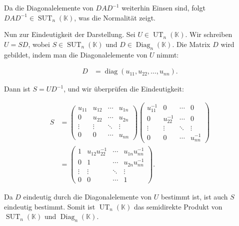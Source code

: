 Da die Diagonalelemente von $DAD^{-1}$ weiterhin Einsen sind, folgt $DAD^{-1} \in \operatorname{SUT}_n(\mathbb{K})$, was die Normalität zeigt.

Nun zur Eindeutigkeit der Darstellung. Sei $U \in \operatorname{UT}_n(\mathbb{K})$. Wir schreiben $U = SD$, wobei $S \in \operatorname{SUT}_n(\mathbb{K})$ und $D \in \operatorname{Diag}_n(\mathbb{K})$. Die Matrix $D$ wird gebildet, indem man die Diagonalelemente von $U$ nimmt:

\begin{align*}
D &= \operatorname{diag}(u_{11}, u_{22}, \ldots, u_{nn}).
\end{align*}

Dann ist $S = UD^{-1}$, und wir überprüfen die Eindeutigkeit:

\begin{align*}
S &= \begin{pmatrix}
u_{11} & u_{12} & \cdots & u_{1n} \\
0 & u_{22} & \cdots & u_{2n} \\
\vdots & \vdots & \ddots & \vdots \\
0 & 0 & \cdots & u_{nn}
\end{pmatrix}
\begin{pmatrix}
u_{11}^{-1} & 0 & \cdots & 0 \\
0 & u_{22}^{-1} & \cdots & 0 \\
\vdots & \vdots & \ddots & \vdots \\
0 & 0 & \cdots & u_{nn}^{-1}
\end{pmatrix} \\
&= \begin{pmatrix}
1 & u_{12} u_{22}^{-1} & \cdots & u_{1n} u_{nn}^{-1} \\
0 & 1 & \cdots & u_{2n} u_{nn}^{-1} \\
\vdots & \vdots & \ddots & \vdots \\
0 & 0 & \cdots & 1
\end{pmatrix}.
\end{align*}

Da $D$ eindeutig durch die Diagonalelemente von $U$ bestimmt ist, ist auch $S$ eindeutig bestimmt. Somit ist $\operatorname{UT}_n(\mathbb{K})$ das semidirekte Produkt von $\operatorname{SUT}_n(\mathbb{K})$ und $\operatorname{Diag}_n(\mathbb{K})$.

